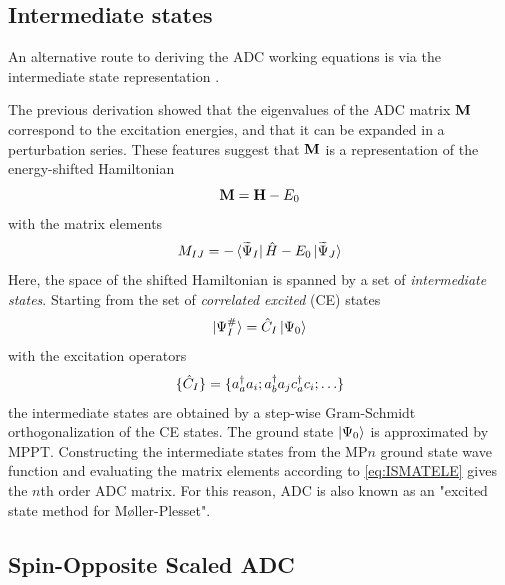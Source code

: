 \subsection{Intermediate states}

An alternative route to deriving the ADC working equations is via the intermediate state representation 
\cite{Sch1991,Sch2004,Kni2012}.

The previous derivation showed that the eigenvalues of the ADC matrix $\mathbf{M}$ correspond to the excitation energies, and that it can be expanded in a perturbation series. These features suggest that $\mathbf{M}$ is a representation of the energy-shifted Hamiltonian
\begin{equation}
\mathbf{M} = \mathbf{H} - E_0
\end{equation}
\noindent with the matrix elements 
\begin{equation}
M_{IJ} = -\bra{\smash{\smash{\widetilde{\Psi}}_I}} \hat{H} - E_0 \ket{\smash{\smash{\widetilde{\Psi}}_J}}
\label{eq:ISMATELE}
\end{equation}
\noindent Here, the space of the shifted Hamiltonian is spanned by a set of \emph{intermediate states}. Starting from the set of \emph{correlated excited} (CE) states
\begin{equation}
\ket{\smash{\Psi^{\#}_I}} = \hat{C}_I \ket{\smash{\Psi_0}} 
\end{equation}
\noindent with the excitation operators
\begin{equation}
\{\hat{C}_I\} = \{ a_a^{\dagger} a_i; a_b^{\dagger} a_j c_a^{\dagger} c_i; \ldots \}
\end{equation}
\noindent the intermediate states are obtained by a step-wise Gram-Schmidt orthogonalization of the CE states. The ground state $\ket{\smash{\Psi_0}}$ is approximated by MPPT. Constructing the intermediate states from the MP$n$ ground state wave function and evaluating the matrix elements according to \ref{eq:ISMATELE} gives the $n$th order ADC matrix. For this reason, ADC is also known as an "excited state method for M{\o}ller-Plesset". 

\subsection{Spin-Opposite Scaled ADC \label{sec:SOSADC}}

